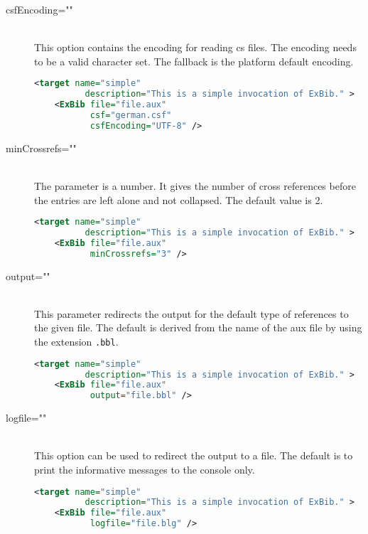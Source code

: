 \begin{description}
\item[csfEncoding=""] \ \\
  This option contains the encoding for reading cs files. The encoding
  needs to be a valid character set. The fallback is the platform
  default encoding.

\begin{lstlisting}[language=XML,morekeywords={target}]
  <target name="simple"
          description="This is a simple invocation of ExBib." >
    <ExBib file="file.aux"
           csf="german.csf" 
           csfEncoding="UTF-8" />
\end{lstlisting}

\item[minCrossrefs=""] \ \\
  The parameter is a number. It gives the number of cross references
  before the entries are left alone and not collapsed. The default
  value is 2.

\begin{lstlisting}[language=XML,morekeywords={target}]
  <target name="simple"
          description="This is a simple invocation of ExBib." >
    <ExBib file="file.aux"
           minCrossrefs="3" />
\end{lstlisting}

\item[output=""] \ \\
  This parameter redirects the output for the default type of
  references to the given file. The default is derived from the name
  of the aux file by using the extension \texttt{.bbl}.

\begin{lstlisting}[language=XML,morekeywords={target}]
  <target name="simple"
          description="This is a simple invocation of ExBib." >
    <ExBib file="file.aux"
           output="file.bbl" />
\end{lstlisting}

\item[logfile=""] \ \\  
  This option can be used to redirect the output to a file. The
  default is to print the informative messages to the console only.

\begin{lstlisting}[language=XML,morekeywords={target}]
  <target name="simple"
          description="This is a simple invocation of ExBib." >
    <ExBib file="file.aux"
           logfile="file.blg" />
\end{lstlisting}


\end{description}
